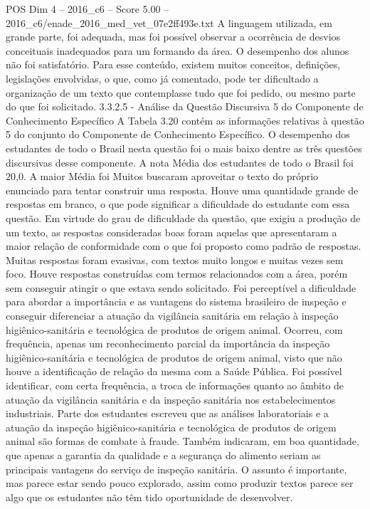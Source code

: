 \begin{textsample}{POS Dim 4 – 2016\_c6 – Score 5.00 – 2016\_c6/enade\_2016\_med\_vet\_07e2ff493e.txt}
A linguagem utilizada, em grande parte, foi adequada, mas foi possível observar a ocorrência de desvios conceituais inadequados para um formando da área.
O desempenho dos alunos não foi satisfatório.
Para esse conteúdo, existem muitos conceitos, definições, legislações envolvidas, o que, como já comentado, pode ter dificultado a organização de um texto que contemplasse tudo que foi pedido, ou mesmo parte do que foi solicitado. 3.3.2.5 - Análise da Questão Discursiva 5 do Componente de Conhecimento Específico A Tabela 3.20 contém as informações relativas à questão 5 do conjunto do Componente de Conhecimento Específico.
O desempenho dos estudantes de todo o Brasil nesta questão foi o mais baixo dentre as três questões discursivas desse componente.
A nota Média dos estudantes de todo o Brasil foi 20,0.
A maior Média foi Muitos buscaram aproveitar o texto do próprio enunciado para tentar construir uma resposta.
Houve uma quantidade grande de respostas em branco, o que pode significar a dificuldade do estudante com essa questão.
Em virtude do grau de dificuldade da questão, que exigiu a produção de um texto, as respostas consideradas boas foram aquelas que apresentaram a maior relação de conformidade com o que foi proposto como padrão de respostas.
Muitas respostas foram evasivas, com textos muito longos e muitas vezes sem foco.
Houve respostas construídas com termos relacionados com a área, porém sem conseguir atingir o que estava sendo solicitado.
Foi perceptível a dificuldade para abordar a importância e as vantagens do sistema brasileiro de inspeção e conseguir diferenciar a atuação da vigilância sanitária em relação à inspeção higiênico-sanitária e tecnológica de produtos de origem animal.
Ocorreu, com frequência, apenas um reconhecimento parcial da importância da inspeção higiênico-sanitária e tecnológica de produtos de origem animal, visto que não houve a identificação de relação da mesma com a Saúde Pública.
Foi possível identificar, com certa frequência, a troca de informações quanto ao âmbito de atuação da vigilância sanitária e da inspeção sanitária nos estabelecimentos industriais.
Parte dos estudantes escreveu que as análises laboratoriais e a atuação da inspeção higiênico-sanitária e tecnológica de produtos de origem animal são formas de combate à fraude.
Também indicaram, em boa quantidade, que apenas a garantia da qualidade e a segurança do alimento seriam as principais vantagens do serviço de inspeção sanitária.
O assunto é importante, mas parece estar sendo pouco explorado, assim como produzir textos parece ser algo que os estudantes não têm tido oportunidade de desenvolver.

\end{textsample}
